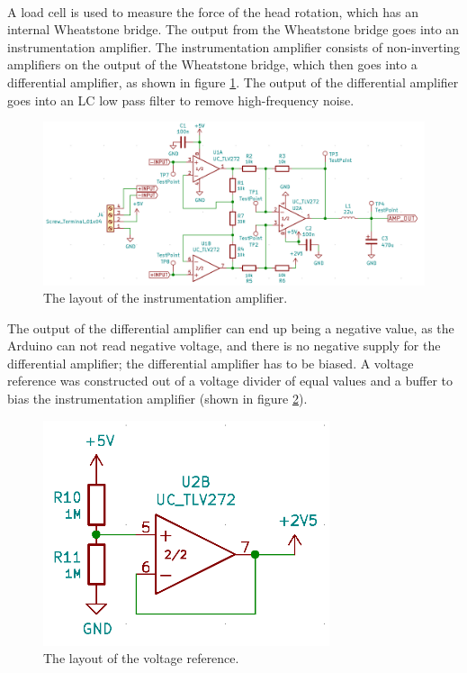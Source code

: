 \documentclass[twoside]{article}
\begin{document}
        \paragraph{}
        A load cell is used to measure the force of the head rotation, which has an internal Wheatstone bridge. The output from the Wheatstone bridge goes into an instrumentation amplifier. The instrumentation amplifier consists of non-inverting amplifiers on the output of the Wheatstone bridge, which then goes into a differential amplifier, as shown in figure \ref{fig:inamp}. The output of the differential amplifier goes into an LC low pass filter to remove high-frequency noise.
        \noindent
        \begin{figure}[H]
            \centering
            \includegraphics[width=\textwidth]{inamp.png}
            \caption{The layout of the instrumentation amplifier.}
            \label{fig:inamp}
        \end{figure}
        The output of the differential amplifier can end up being a negative value, as the Arduino can not read negative voltage, and there is no negative supply for the differential amplifier; the differential amplifier has to be biased. A voltage reference was constructed out of a voltage divider of equal values and a buffer to bias the instrumentation amplifier (shown in figure \ref{fig:vref}).
        \noindent
        \begin{figure}[H]
            \centering
            \includegraphics[width=0.75\textwidth]{vref.png}
            \caption{The layout of the voltage reference.}
            \label{fig:vref}
        \end{figure}
\end{document}
